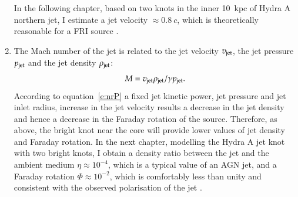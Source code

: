 \begin{enumerate}
In the following chapter, based on two knots in the inner 10~kpc of Hydra A northern jet, I estimate a jet velocity $\approx 0.8~c$, which is theoretically reasonable for a FRI source \citep{laing14}. 

\item The Mach number of the jet is related to the jet velocity $v_{\rm jet}$, the jet pressure $p_{\rm jet}$ and the jet density $\rho_{\rm jet}$:
\begin{equation}
M = v_{\rm jet} \rho_{\rm jet}/ \gamma p_{\rm jet}.
\end{equation} 
According to equation~\ref{e:nrP} a fixed jet kinetic power, jet pressure and jet inlet radius, increase in the jet velocity results a decrease in the jet density and hence a decrease in the Faraday rotation of the source. Therefore, as above, the bright knot near the core will provide lower values of jet density and Faraday rotation. In the next chapter, modelling the Hydra A jet knot with two bright knots, I obtain a density ratio between the jet and the ambient medium $\eta \approx 10^{-4}$, which is a typical value of an AGN jet, and a Faraday rotation $\Phi \approx 10^{-2}$, which is comfortably less than unity and consistent with the observed polarisation of the jet \citep{taylor93}.
\end{enumerate}


 


% 
%

